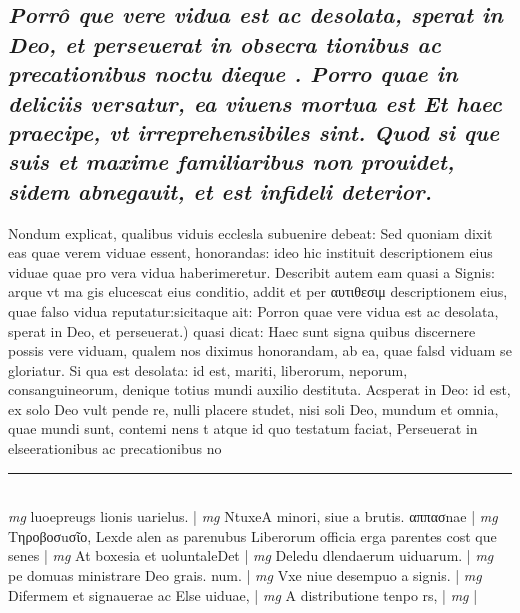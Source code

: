 \documentclass{article}
\begin{document}
\begin{pages}
{}
\subsection*{\textit{Porrô que vere vidua est ac desolata, sperat in Deo, et perseuerat in obsecra tionibus ac precationibus noctu dieque . Porro quae in deliciis versatur, ea viuens mortua est Et haec praecipe, vt irreprehensibiles sint. Quod si que suis et maxime familiaribus non prouidet, sidem abnegauit, et est infideli deterior. }}\pstart Nondum explicat, qualibus viduis ecclesla subuenire debeat: Sed quoniam dixit eas quae verem viduae essent, honorandas: ideo hic instituit descriptionem eius viduae quae pro vera vidua haberimeretur. Describit autem eam quasi a Signis: arque vt ma gis elucescat eius conditio, addit et per αυτιθεσιμ descriptionem eius, quae falso vidua reputatur:sicitaque ait:  \pend\pstart Porron quae vere vidua est ac desolata, sperat in Deo, et perseuerat.) quasi dicat: Haec sunt signa quibus discernere possis vere viduam, qualem nos diximus honorandam, ab ea, quae falsd viduam se gloriatur. Si qua est desolata: id est, mariti, liberorum, neporum, consanguineorum, denique totius mundi auxilio destituta. Acsperat in Deo: id est, ex solo Deo vult pende re, nulli placere studet, nisi soli Deo, mundum et omnia, quae mundi sunt, contemi nens t atque id quo testatum faciat, Perseuerat in elseerationibus ac precationibus no\pend
\vspace{0.5cm}\noindent
\vspace{0.2cm}\rule{1cm}{0.2pt}\\ 
\hspace{0.2cm}\textit{mg}
\footnotesize luoepreugs lionis uarielus. 
\normalsize| 
\hspace{0.2cm}\textit{mg}
\footnotesize  NtuxeA minori, siue a brutis. αππασnae 
\normalsize| 
\hspace{0.2cm}\textit{mg}
\footnotesize Τηροβοσuσῖο, Lexde alen as parenubus  Liberorum officia erga parentes cost que senes
\normalsize| 
\hspace{0.2cm}\textit{mg}
\footnotesize At boxesia et uoluntaleDet
\normalsize| 
\hspace{0.2cm}\textit{mg}
\footnotesize Deledu dlendaerum uiduarum. 
\normalsize| 
\hspace{0.2cm}\textit{mg}
\footnotesize pe domuas ministrare Deo grais. num. 
\normalsize| 
\hspace{0.2cm}\textit{mg}
\footnotesize Vxe niue desempuo a signis. 
\normalsize| 
\hspace{0.2cm}\textit{mg}
\footnotesize Difermem et signauerae ac Else uiduae, 
\normalsize| 
\hspace{0.2cm}\textit{mg}
\footnotesize A distributione tenpo rs, 
\normalsize| 
\hspace{0.2cm}\textit{mg}
\footnotesize 
\normalsize| 

\end{pages}
\end{document}
